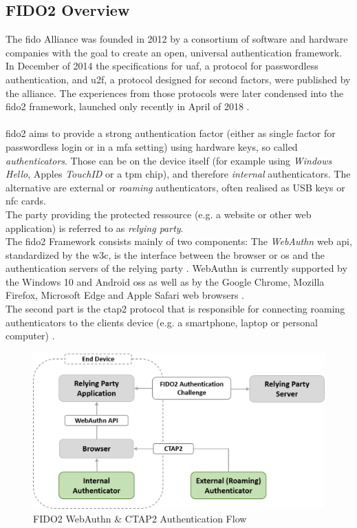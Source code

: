 \subsection{FIDO2 Overview}
\label{subsec:fido2_webauthn}

The \ac{fido} Alliance was founded in 2012 by a consortium of software and hardware companies with the goal to create an open, universal authentication framework. In December of 2014 the specifications for \acl{uaf}, a protocol for passwordless authentication, and \acl{u2f}, a protocol designed for second factors, were published by the alliance. The experiences from those protocols were later condensed into the \ac{fido2} framework, launched only recently in April of 2018 \cite{fido_history}.\\
\\
\ac{fido2} aims to provide a strong authentication factor (either as single factor for passwordless login or in a \ac{mfa} setting) using hardware keys, so called \emph{authenticators}. Those can be on the device itself (for example using \emph{Windows Hello}, Apples \emph{TouchID} or a \ac{tpm} chip), and therefore \emph{internal} authenticators. The alternative are external or \emph{roaming} authenticators, often realised as USB keys or \ac{nfc} cards.\\
The party providing the protected ressource (e.g. a website or other web application) is referred to as \emph{relying party}.\\
The \ac{fido2} Framework consists mainly of two components: The \emph{WebAuthn} web \ac{api}, standardized by the \ac{w3c}, is the interface between the browser or \ac{os} and the authentication servers of the relying party \cite{webauthn_standard}. WebAuthn is currently supported by the Windows 10 and Android \acp{os} as well as by the Google Chrome, Mozilla Firefox, Microsoft Edge and Apple Safari web browsers \cite{fido2_webauthn}.\\
The second part is the \ac{ctap2} protocol that is responsible for connecting roaming authenticators to the clients device (e.g. a smartphone, laptop or personal computer) \cite{fido2_overview,fido2_ctap}.\\

\begin{figure}[!ht]
    \centering
    \includegraphics[width=1.8\columnwidth]{Figures/fido2_webauth_ctap_flow.png}
    \caption[FIDO2 Authentication Flow]{FIDO2 WebAuthn \& CTAP2 Authentication Flow}
    \label{fig:fido2_webauth_ctap_flow}
\end{figure}

